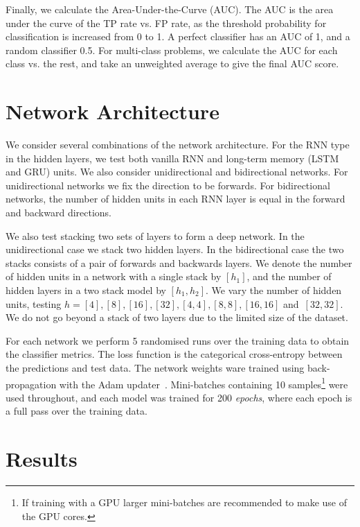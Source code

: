 \documentclass[twocolumn]{aastex61}
\begin{document}
Finally, we calculate the Area-Under-the-Curve (AUC). The AUC is the area under the curve of the TP rate vs. FP rate, as the threshold probability for classification is increased from 0 to 1. A perfect classifier has an AUC of 1, and a random classifier 0.5. For multi-class problems, we calculate the AUC for each class vs. the rest, and take an unweighted average to give the final AUC score. 

\section{Network Architecture}

We consider several combinations of the network architecture. For the RNN type in the hidden layers, we test both vanilla RNN and long-term memory (LSTM and GRU) units. We also consider unidirectional and bidirectional networks. For unidirectional networks we fix the direction to be forwards. For bidirectional networks, the number of hidden units in each RNN layer is equal in the forward and backward directions. 

We also test stacking two sets of layers to form a deep network.  In the unidirectional case we stack two hidden layers. In the bidirectional case the two stacks consists  of a pair  of forwards and backwards layers.  We denote the number of hidden units in a network with a  single stack by $[h_1]$, and the number of hidden layers in a two stack model by $[h_1, h_2]$. We vary the number of hidden units, testing $h=[4],[8],[16],[32],[4,4],[8,8],[16,16]$ and~$[32,32]$. We do not go beyond a stack of two layers due to the limited size of the dataset. 

For each network we perform 5 randomised runs over the training data to obtain the classifier metrics. The loss function is the categorical cross-entropy between the predictions and test data. The network weights ware trained using back-propagation with the {\ttfamily Adam} updater~\cite{2014arXiv1412.6980K}. Mini-batches containing 10 samples\footnote{If training with a GPU larger mini-batches are recommended to make use of the GPU cores.} were used throughout, and each model was trained for 200 {\em epochs}, where each epoch is a full pass over the training data.

\section{Results}
\end{document}
